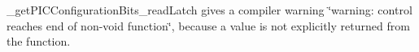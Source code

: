 
\begin{DoxyRefList}
\item[\label{bug__bug000001}%
\hypertarget{bug__bug000001}{}%
File \hyperlink{getPICConfigurationBits_8h}{get\+P\+I\+C\+Configuration\+Bits.h} ]\+\_\+get\+P\+I\+C\+Configuration\+Bits\+\_\+read\+Latch gives a compiler warning \char`\"{}warning\+: control reaches end of non-\/void function\char`\"{}, because a value is not explicitly returned from the function.
\end{DoxyRefList}